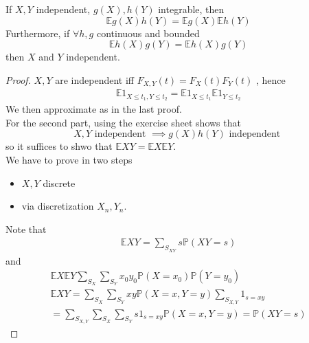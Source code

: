 \documentclass[../main.tex]{subfiles}
\begin{document}
\begin{propo}
If $X,Y$ independent, $g( X) ,h( Y) $ integrable, then
\[ 
\mathbb{E}g( X) h( Y) = \mathbb{E}g( X) \mathbb{E}h( Y) 
\]
Furthermore, if $\forall h,g$ continuous and bounded
\[ 
\mathbb{E}h( X) g( Y) = \mathbb{E}h( X) g( Y) 
\]
then $X$ and $Y$ independent.
\end{propo}
\begin{proof}
$X,Y$ are independent iff $F_{X,Y} ( t) = F_X( t) F_Y( t) $ , hence
\begin{align*}
\mathbb{E} 1_{X \leq t_1, Y \leq t_2} = \mathbb{E} 1_{X \leq t_1} \mathbb{E}1_{Y \leq  t_2} 	
\end{align*}
We then approximate as in the last proof.\\
For the second part, using the exercise sheet shows that
\[ 
X,Y \text{ independent } \implies g( X) h( Y) \text{ independent } 
\]
so it suffices to shwo that $ \mathbb{E}XY= \mathbb{E}X \mathbb{E}Y$.\\
We have to prove in two steps
\begin{itemize}
\item $X,Y$ discrete
\item via discretization $X_n, Y_n$. 
\end{itemize}
Note that
\begin{align*}
\mathbb{E}XY = \sum_{S_{XY} }^{ } s \mathbb{P}( XY=s) 
\end{align*}
and
\begin{align*}
\mathbb{E}X \mathbb{E}Y \sum_{S_X}^{ } \sum_{S_Y}^{ } x_0y_0 \mathbb{P}( X=x_0) \mathbb{P}( Y=y_0) \\
\mathbb{E}XY = \sum_{S_X}^{ } \sum_{S_Y}^{ } xy \mathbb{P}( X=x, Y=y) \sum_{S_{X,Y} }^{ } 1_{s=xy} \\
= \sum_{S_{X,Y} }^{ } \sum_{S_X}^{ } \sum_{S_Y}^{ } s 1_{s=xy} \mathbb{P}( X=x, Y=y) = \mathbb{P}( XY=s) 
\end{align*}


\end{proof}
\end{document}
